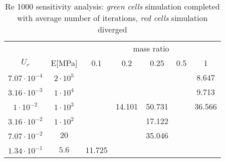\begin{table}[!htb]
	\begin{center}
		\begin{tabular}{ c | c | c c c c c} 
         &  & \multicolumn{5}{c}{mass ratio} \\
         
        $U_r$ & E[\si{MPa}] & 0.1 & 0.2 & 0.25 & 0.5 & 1 \\
        \hline
        
        $7.07\cdot 10^{-4}$ & $2\cdot 10^{5}$ & \cellcolor{green!10} & \cellcolor{green!10} & \cellcolor{green!10} & \cellcolor{green!10} & \cellcolor{green!10}8.647 \\
        $3.16\cdot 10^{-3}$ & $1\cdot 10^{4}$ & \cellcolor{green!10} & \cellcolor{green!10} & \cellcolor{green!10} & \cellcolor{green!10} & \cellcolor{green!10}9.713 \\        
        $1\cdot 10^{-2}$ & $1\cdot 10^{3}$ & \cellcolor{green!10} & \cellcolor{green!10}14.101 & \cellcolor{green!10}50.731 & \cellcolor{green!10} & \cellcolor{green!10}36.566 \\
        $3.16\cdot 10^{-2}$ & $1\cdot 10^{2}$ & \cellcolor{green!10} & \cellcolor{green!10} & \cellcolor{green!10}17.122 & \cellcolor{red!10} & \cellcolor{red!10} \\
        $7.07\cdot 10^{-2}$ & $20$ & \cellcolor{green!10} & \cellcolor{green!10} & \cellcolor{green!10}35.046 & \cellcolor{red!10} & \cellcolor{red!10} \\
        $1.34\cdot 10^{-1}$ & $5.6$ & \cellcolor{green!10}11.725 & \cellcolor{red!10} & \cellcolor{red!10} & \cellcolor{red!10} & \cellcolor{red!10} \\                        
 		\end{tabular}
	\end{center}
	\caption{Re 1000 sensitivity analysis: \textit{green cells} simulation completed with average number of iterations, \textit{red cells} simulation diverged}
	\label{table:Re1000-sens}
\end{table}